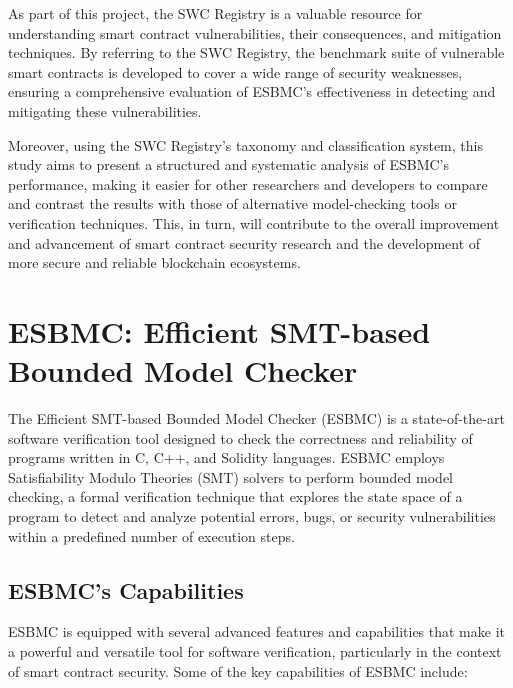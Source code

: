As part of this project, the SWC Registry is a valuable resource for understanding smart contract vulnerabilities, their consequences, and mitigation techniques. By referring to the SWC Registry, the benchmark suite of vulnerable smart contracts is developed to cover a wide range of security weaknesses, ensuring a comprehensive evaluation of ESBMC's effectiveness in detecting and mitigating these vulnerabilities.

Moreover, using the SWC Registry's taxonomy and classification system, this study aims to present a structured and systematic analysis of ESBMC's performance, making it easier for other researchers and developers to compare and contrast the results with those of alternative model-checking tools or verification techniques. This, in turn, will contribute to the overall improvement and advancement of smart contract security research and the development of more secure and reliable blockchain ecosystems.

\section{ESBMC: Efficient SMT-based Bounded Model Checker}

The Efficient SMT-based Bounded Model Checker (ESBMC) is a state-of-the-art software verification tool designed to check the correctness and reliability of programs written in C, C++, and Solidity languages. ESBMC employs Satisfiability Modulo Theories (SMT) solvers to perform bounded model checking, a formal verification technique that explores the state space of a program to detect and analyze potential errors, bugs, or security vulnerabilities within a predefined number of execution steps.

\subsection{ESBMC's Capabilities}

ESBMC is equipped with several advanced features and capabilities that make it a powerful and versatile tool for software verification, particularly in the context of smart contract security. Some of the key capabilities of ESBMC include:

